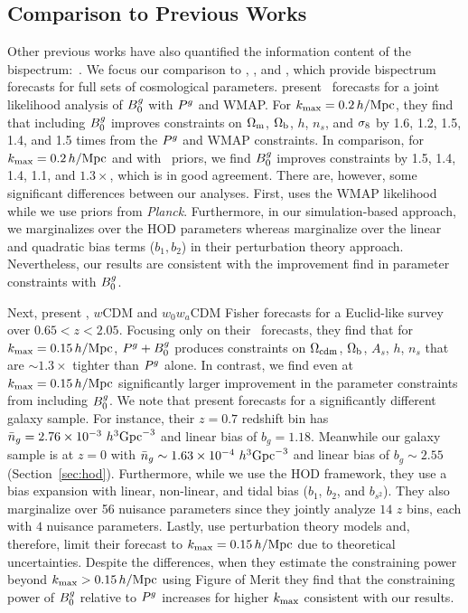 \subsection{Comparison to Previous Works}
Other previous works have also quantified the information content of the
bispectrum:~\citep[\eg][]{scoccimarro2004, sefusatti2006, sefusatti2007,
song2015, tellarini2016, yamauchi2017a, karagiannis2018, yankelevich2019,
chudaykin2019, coulton2019, reischke2019, agarwal2020}. 
We focus our comparison to \cite{sefusatti2006}, \cite{yankelevich2019},
\cite{agarwal2020} and \cite{chudaykin2019}, which provide bispectrum forecasts for 
full sets of cosmological parameters.
\cite{sefusatti2006} present \lcdm~forecasts for a joint likelihood analysis of
$B^g_0$ with $P^g$ and WMAP. For $k_{\rm max} = 0.2\,h/\mathrm{Mpc}$, they find that including
$B^g_0$ improves constraints on $\Omega_{\rm m}$, $\Omega_{\rm b}$, $h$, $n_s$, and $\sigma_8$ by 1.6, 1.2,
1.5, 1.4, and 1.5 times from the $P^g$ and WMAP constraints. In comparison, for 
$k_{\rm max} = 0.2\,h/\mathrm{Mpc}$ and with \planck~priors, we find $B^g_0$ improves constraints
by  1.5, 1.4, 1.4, 1.1, and $1.3\times$, which is in good agreement. There are,
however, some significant differences between our analyses. First, \cite{sefusatti2006} 
uses the WMAP likelihood while we use priors from {\em Planck}. Furthermore, 
in our simulation-based approach, we marginalizes over the HOD parameters
whereas \cite{sefusatti2006} marginalize over the linear and quadratic bias
terms ($b_1, b_2$) in their perturbation theory approach. Nevertheless, our
results are consistent with the improvement \cite{sefusatti2006} find in
parameter constraints with $B^g_0$. 

Next, \cite{yankelevich2019} present \lcdm, $w$CDM and $w_0w_a$CDM Fisher
forecasts for a Euclid-like survey~\citep{laureijs2011} over $0.65 < z < 2.05$.
Focusing only on their \lcdm~forecasts, they find that for $k_{\rm max} = 0.15\,h/\mathrm{Mpc}$, 
$P^g+B^g_0$ produces constraints on $\Omega_{\rm cdm}$, $\Omega_{\rm b}$, $A_s$, $h$, $n_s$ 
that are ${\sim}1.3\times$ tighter than $P^g$ alone. In contrast, we find even
at $k_{\rm max}=0.15\,h/\mathrm{Mpc}$ significantly larger improvement in the parameter constraints 
from including $B^g_0$. We note that \cite{yankelevich2019} present forecasts for
a significantly different galaxy sample. For instance, their $z = 0.7$ redshift
bin has $\bar{n}_g = 2.76 \times 10^{-3}~h^3{\rm Gpc}^{-3}$ and linear bias of
$b_g = 1.18$. Meanwhile our galaxy sample is at $z=0$ with $\bar{n}_g \sim 1.63\times
10^{-4}~h^3{\rm Gpc}^{-3}$ and linear bias of $b_g \sim 2.55$
(Section~\ref{sec:hod}). Furthermore, while we use the HOD framework, they use
a bias expansion with linear, non-linear, and tidal bias ($b_1$, $b_2$, and
$b_{s^2}$). They also marginalize over 56 nuisance parameters since they
jointly analyze $14$ $z$ bins, each with $4$ nuisance parameters.  Lastly,
\cite{yankelevich2019} use perturbation theory models and, therefore, limit
their forecast to $k_{\rm max} = 0.15\,h/\mathrm{Mpc}$ due
to theoretical uncertainties. Despite the differences, when they estimate the constraining
power beyond $k_{\rm max} > 0.15\,h/\mathrm{Mpc}$ using Figure of Merit they find that the
constraining power of $B^g_0$ relative to $P^g$ increases for higher $k_{\rm max}$
consistent with our results. 

